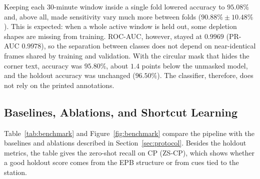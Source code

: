 Keeping each $30$-minute window inside a single fold lowered accuracy to $95.08\%$ and, above all, made sensitivity vary much more between folds ($90.88\% \pm 10.48\%$). This is expected: when a whole active window is held out, some depletion shapes are missing from training. ROC-AUC, however, stayed at $0.9969$ (PR-AUC $0.9978$), so the separation between classes does not depend on near-identical frames shared by training and validation. With the circular mask that hides the corner text, accuracy was $95.80\%$, about $1.4$ points below the unmasked model, and the holdout accuracy was unchanged ($96.50\%$). The classifier, therefore, does not rely on the printed annotations.

\subsection{Baselines, Ablations, and Shortcut Learning}

Table~\ref{tab:benchmark} and Figure~\ref{fig:benchmark} compare the pipeline with the baselines and ablations described in Section~\ref{sec:protocol}. Besides the holdout metrics, the table gives the zero-shot recall on CP (ZS-CP), which shows whether a good holdout score comes from the EPB structure or from cues tied to the station.

